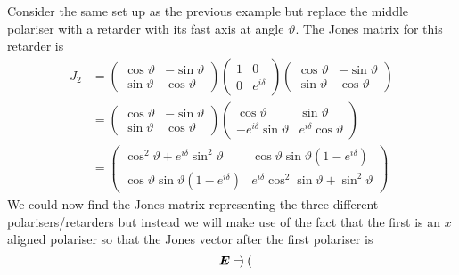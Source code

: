     \begin{example}
        Consider the same set up as the previous example but replace the middle polariser with a retarder with its fast axis at angle \(\vartheta\).
        The Jones matrix for this retarder is
        \begin{align*}
            J_2 &= 
            \begin{pmatrix}
                \cos\vartheta & -\sin\vartheta\\
                \sin\vartheta & \cos\vartheta
            \end{pmatrix}
            \begin{pmatrix}
                1 & 0\\
                0 & e^{i\delta}
            \end{pmatrix}
            \begin{pmatrix}
                \cos\vartheta & -\sin\vartheta\\
                \sin\vartheta & \cos\vartheta
            \end{pmatrix}
            \\
            &=
            \begin{pmatrix}
                \cos\vartheta & -\sin\vartheta\\
                \sin\vartheta & \cos\vartheta
            \end{pmatrix}
            \begin{pmatrix}
                \cos\vartheta & \sin\vartheta\\
                -e^{i\delta}\sin\vartheta & e^{i\delta}\cos\vartheta
            \end{pmatrix}
            \\
            &= 
            \begin{pmatrix}
                \cos^2\vartheta + e^{i\delta}\sin^2\vartheta & \cos\vartheta\sin\vartheta(1 - e^{i\delta})\\
                \cos\vartheta\sin\vartheta(1 - e^{i\delta}) & e^{i\delta}\cos^2\sin\vartheta + \sin^2\vartheta
            \end{pmatrix}
        \end{align*}
        We could now find the Jones matrix representing the three different polarisers/retarders but instead we will make use of the fact that the first is an \(x\) aligned polariser so that the Jones vector after the first polariser is
        \[
            \bm{E} = 
            \begin{pmatrix}

\end{pmatrix}\]
\end{example}
